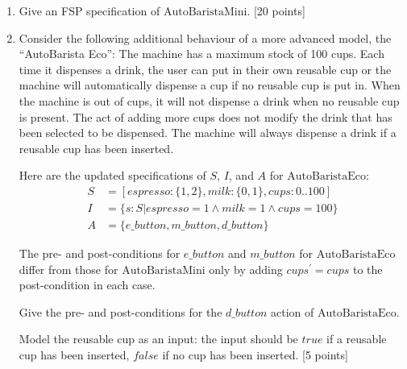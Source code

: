\documentclass[12pt,fleqn]{article}
\begin{document}
\begin{enumerate}
\clearpage

\item Give an FSP specification of $\mathrm{AutoBaristaMini}$. [20 points]




\clearpage

\item Consider the following additional behaviour of a more advanced model, the ``AutoBarista Eco'': The machine has a maximum stock of 100 cups. Each time it dispenses a drink, the user can put in their own reusable cup or the machine will automatically dispense a cup if no reusable cup is put in. When the machine is out of cups, it will not dispense a drink when no reusable cup is present. The act of adding more cups does not modify the drink that has been selected to be dispensed. The machine will always dispense a drink if a reusable cup has been inserted.

Here are the updated specifications of $S$, $I$, and $A$ for $\mathrm{AutoBaristaEco}$:
\begin{equation*}\begin{split}
S &= [ espresso :\{ 1, 2 \}, milk : \{ 0, 1 \}, cups : 0..100 ]\\
I &= \{ s: S | espresso = 1 \land milk = 1 \land cups = 100 \}\\
A &= \{ e\_button, m\_button, d\_button\}
\end{split}\end{equation*}

The pre- and post-conditions for $e\_button$ and $m\_button$ for $\mathrm{AutoBaristaEco}$ differ from those for $\mathrm{AutoBaristaMini}$ only by adding $cups^\prime = cups$ to the post-condition in each case.

Give the pre- and post-conditions for the $d\_button$ action of $\mathrm{AutoBaristaEco}$.

Model the reusable cup as an input: the input should be $true$ if a reusable cup has been inserted, $false$ if no cup has been inserted. [5 points]




\clearpage


\end{enumerate}
\end{document}
